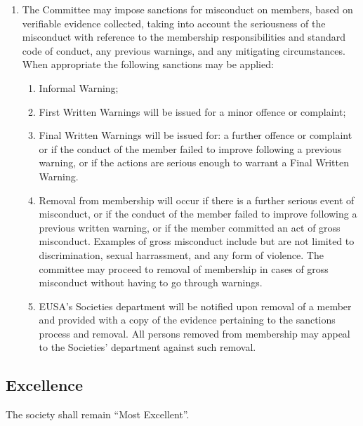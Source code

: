 \begin{enumerate}
    \item The Committee may impose sanctions for misconduct on members, based on verifiable evidence collected, taking into account the seriousness of the misconduct with reference to the membership responsibilities and standard code of conduct, any previous warnings, and any mitigating circumstances. When appropriate the following sanctions may be applied:
      \begin{enumerate}
      \item Informal Warning;
      \item First Written Warnings will be issued for a minor offence or complaint;
      \item Final Written Warnings will be issued for: a further offence or complaint or if the conduct of the member failed to improve following a previous warning, or if the actions are serious enough to warrant a Final Written Warning.
      \item Removal from membership will occur if there is a further serious event of misconduct, or if the conduct of the member failed to improve following a previous written warning, or if the member committed an act of gross misconduct. Examples of gross misconduct include but are not limited to discrimination, sexual harrassment, and any form of violence. The committee may proceed to removal of membership in cases of gross misconduct without having to go through warnings.
      \item EUSA's Societies department will be notified upon removal of a member and provided with a copy of the evidence pertaining to the sanctions process and removal. All persons removed from membership may appeal to the Societies' department against such removal.
      \end{enumerate}
\end{enumerate}

\subsection{Excellence}
The society shall remain \enquote{Most Excellent}.

